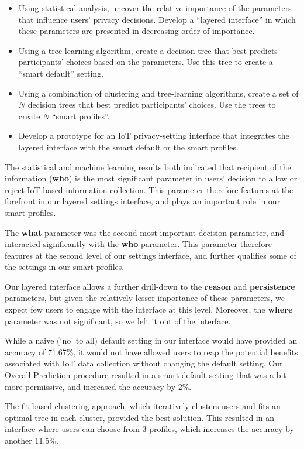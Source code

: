 \begin{itemize}
	\item Using statistical analysis, uncover the relative importance of the parameters that influence users' privacy decisions. Develop a ``layered interface'' in which these parameters are presented in decreasing order of importance.
	\item Using a tree-learning algorithm, create a decision tree that best predicts participants' choices based on the parameters. Use this tree to create a ``smart default'' setting.
	\item Using a combination of clustering and tree-learning algorithms, create a set of $N$ decision trees that best predict participants' choices. Use the trees to create $N$ ``smart profiles''.
	\item Develop a prototype for an IoT privacy-setting interface that integrates the layered interface with the smart default or the smart profiles.
\end{itemize}

The statistical and machine learning results both indicated that recipient of the information (\textbf{who}) is the most significant parameter in users' decision to allow or reject IoT-based information collection. This parameter therefore features at the forefront in our layered settings interface, and plays an important role in our smart profiles.

The \textbf{what} parameter was the second-most important decision parameter, and interacted significantly with the \textbf{who} parameter. This parameter therefore features at the second level of our settings interface, and further qualifies some of the settings in our smart profiles.

Our layered interface allows a further drill-down to the \textbf{reason} and \textbf{persistence} parameters, but given the relatively lesser importance of these parameters, we expect few users to engage with the interface at this level. Moreover, the \textbf{where} parameter was not significant, so we left it out of the interface.

While a naive (`no' to all) default setting in our interface would have provided an accuracy of 71.67\%, it would not have allowed users to reap the potential benefits associated with IoT data collection without changing the default setting. Our Overall Prediction procedure resulted in a smart default setting that was a bit more permissive, and increased the accuracy by 2\%.

The fit-based clustering approach, which iteratively clusters users and fits an optimal tree in each cluster, provided the best solution. This resulted in an interface where users can choose from 3 profiles, which increases the accuracy by another 11.5\%.

